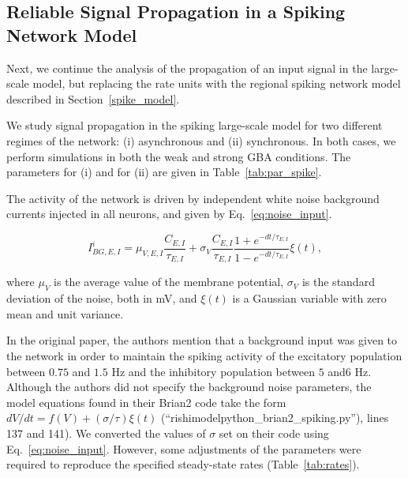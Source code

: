 \subsection{Reliable Signal Propagation in a Spiking Network Model}\label{gba_spk}

Next, we continue the analysis of the propagation of an input signal in the large-scale model, but replacing the rate units with the regional spiking network model described in Section~\ref{spike_model}.

We study signal propagation in the spiking large-scale model for two different regimes of the network: (i) asynchronous and (ii) synchronous. In both cases, we perform simulations in both the weak and strong GBA conditions. The parameters for (i) and for (ii) are given in Table~\ref{tab:par_spike}.

The activity of the network is driven by independent white noise background currents injected in all neurons, and given by Eq.~\ref{eq:noise_input}.

\begin{equation}
    I_{BG,E,I}^{i} = \mu_{V,E,I}\frac{C_{E,I}}{\tau_{E,I}} + \sigma_{V} \frac{C_{ E,I}}{\tau_{E,I}}\frac{1+e^{-dt/\tau_{E,I}}}{1-e^{-dt/\tau_{E,I}}}\xi(t),
    \label{eq:noise_input}
\end{equation}

\noindent where $\mu_{V}$ is the average value of the membrane potential, $\sigma_{V}$ is the standard deviation of the noise, both in mV, and $\xi(t)$ is a Gaussian variable with zero mean and unit variance. 

In the original paper, the authors mention that a background input was given to the network in order to maintain the spiking activity of the excitatory population between $0.75$ and $1.5$ Hz and the inhibitory population between $5$ and$6$ Hz. Although the authors did not specify the background noise parameters, the model equations found in their Brian2 code take the form $dV/dt = f(V) + (\sigma/\tau)\xi(t)$ (``rishimodelpython\_brian2\_spiking.py''), lines 137 and 141). We converted the values of $\sigma$ set on their code using Eq.~\ref{eq:noise_input}. However, some adjustments of the parameters were required to reproduce the specified steady-state rates (Table~\ref{tab:rates}).


